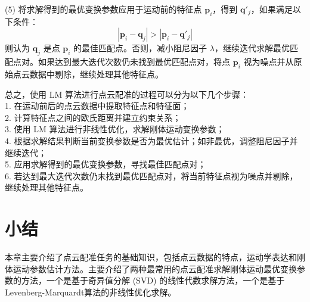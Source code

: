  (5) 将求解得到的最优变换参数应用于运动前的特征点 $\boldsymbol{p}_i$，得到 $\boldsymbol{q}'_j$，如果满足以下条件：
\begin{equation}
|\boldsymbol{p}_i - \boldsymbol{q}_j| > |\boldsymbol{p}_i - \boldsymbol{q}'_j|
\end{equation}
则认为 $\boldsymbol{q}_j$ 是点 $\boldsymbol{p}_i$ 的最佳匹配点。否则，减小阻尼因子 $\lambda$，继续迭代求解最优匹配点对。如果达到最大迭代次数仍未找到最优匹配点对，将点 $\boldsymbol{p}_i$ 视为噪点并从原始点云数据中剔除，继续处理其他特征点。

总之，使用 LM 算法进行点云配准的过程可以分为以下几个步骤：\\
1. 在运动前后的点云数据中提取特征点和特征面；\\
2. 计算特征点之间的欧氏距离并建立约束关系；\\
3. 使用 LM 算法进行非线性优化，求解刚体运动变换参数；\\
4. 根据求解结果判断当前变换参数是否为最优估计；如非最优，调整阻尼因子并继续迭代；\\
5. 应用求解得到的最优变换参数，寻找最佳匹配点对；\\
6. 若达到最大迭代次数仍未找到最优匹配点对，将当前特征点视为噪点并剔除，继续处理其他特征点。

\section{小结}
本章主要介绍了点云配准任务的基础知识，包括点云数据的特点，运动学表达和刚体运动参数估计方法。主要介绍了两种最常用的点云配准求解刚体运动最优变换参数的方法，一个是基于奇异值分解 (SVD) 的线性代数求解方法，一个是基于Levenberg-Marquardt算法的非线性优化求解。